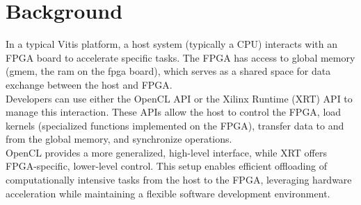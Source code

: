 \section{Background}
In a typical Vitis platform, a host system (typically a CPU) interacts with an FPGA board to accelerate specific tasks. The FPGA has access to global memory (gmem, the ram on the fpga board), which serves as a shared space for data exchange between the host and FPGA. \\

Developers can use either the OpenCL API or the Xilinx Runtime (XRT) API to manage this interaction. These APIs allow the host to control the FPGA, load kernels (specialized functions implemented on the FPGA), transfer data to and from the global memory, and synchronize operations. \\

OpenCL provides a more generalized, high-level interface, while XRT offers FPGA-specific, lower-level control. This setup enables efficient offloading of computationally intensive tasks from the host to the FPGA, leveraging hardware acceleration while maintaining a flexible software development environment.